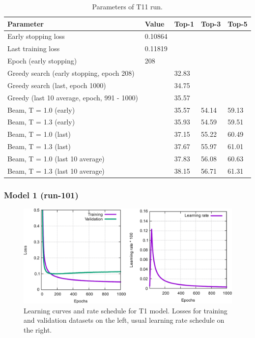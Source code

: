 \documentclass{article}
\begin{document}
\begin{table}[h!]
\caption{Parameters of T11 run.}
  \centering
  \begin{tabular}{p{8.2cm}p{1.5cm}p{1.5cm}p{1.5cm}p{1.5cm}}
    \toprule
    Parameter & Value & Top-1 & Top-3 & Top-5 \\
    \midrule
    Early stopping loss & 0.10864 & & & \\
    Last training loss & 0.11819 & & & \\
    Epoch (early stopping) & 208 & & & \\
    \midrule
    Greedy search (early stopping, epoch 208) & & 32.83 & &\\
    Greedy search (last, epoch 1000) & & 34.75 & & \\
    Greedy (last 10 average, epoch, 991 - 1000) & & 35.57 & & \\
    \midrule
    Beam, T = 1.0 (early) & & 35.57 & 54.14 & 59.13 \\
    Beam, T = 1.3 (early) & & 35.93 & 54.59 & 59.51 \\ 
    \midrule
    Beam, T = 1.0 (last) & & 37.15 & 55.22 &  60.49 \\
    Beam, T = 1.3 (last) & & 37.67 & 55.97 & 61.01 \\ 
    \midrule
    Beam, T = 1.0 (last 10 average) & & 37.83 & 56.08 &  60.63 \\
    Beam, T = 1.3 (last 10 average) & & 38.15 & 56.71 & 61.31 \\ 
    \bottomrule
  \end{tabular}
  \label{tbl:t11}

\end{table} 

\newpage

\subsubsection{Model 1 (run-101)}
  
\begin{figure}[h!]
  \centering
  \includegraphics[width = 16.5cm]{images/t12.pdf}
  \caption{Learning curves and rate schedule for T1 model. Losses for training and validation datasets on the left, usual learning rate schedule on the right.}
  \label{fig:t11}
\end{figure}
\end{document}
